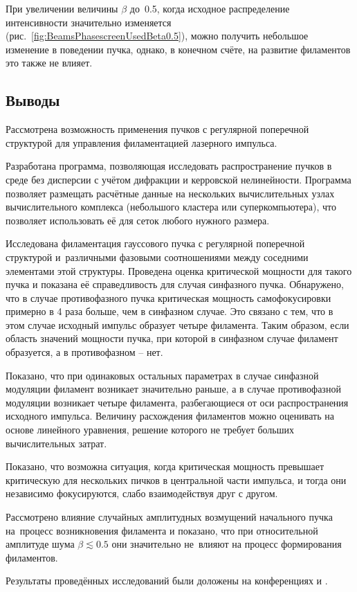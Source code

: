 
При увеличении величины $\beta$ до~0.5, когда исходное распределение интенсивности значительно изменяется (рис.~\ref{fig:BeamsPhasescreenUsedBeta0.5}),
можно получить небольшое изменение в поведении пучка, однако, в конечном счёте, на развитие филаментов это также не влияет.


\subsection{Выводы}

Рассмотрена возможность применения пучков с регулярной поперечной структурой для управления филаментацией
лазерного импульса.


Разработана программа, позволяющая исследовать распространение пучков в среде без дисперсии
с учётом дифракции и керровской нелинейности. Программа позволяет размещать расчётные данные
на нескольких вычислительных узлах вычислительного комплекса (небольшого кластера или суперкомпьютера),
что позволяет использовать её для сеток любого нужного размера.


Исследована филаментация гауссового пучка с регулярной поперечной структурой и~различными фазовыми соотношениями
между соседними элементами этой структуры. Проведена оценка критической мощности для такого пучка и показана её справедливость
для случая синфазного пучка. Обнаружено, что в случае противофазного пучка критическая мощность самофокусировки
примерно в 4 раза больше, чем в синфазном случае. Это связано с тем, что в этом случае исходный импульс образует четыре филамента.
Таким образом, если область значений мощности пучка, при которой в синфазном случае филамент образуется, а в противофазном -- нет.


Показано, что при одинаковых остальных параметрах в случае синфазной модуляции филамент
возникает значительно раньше, а в случае противофазной модуляции возникает четыре филамента,
разбегающиеся от оси распространения исходного импульса. Величину расхождения филаментов
можно оценивать на основе линейного уравнения, решение которого не требует больших вычислительных затрат.


Показано, что возможна ситуация, когда критическая мощность превышает критическую
для нескольких пичков в центральной части импульса, и тогда они независимо фокусируются, слабо взаимодействуя друг с другом.


Рассмотрено влияние случайных амплитудных возмущений начального пучка на~процесс возникновения
филамента и показано, что при относительной амплитуде шума $\beta \lesssim 0.5$ они значительно
не~влияют на процесс формирования филаментов.


Результаты проведённых исследований были доложены на конференциях \cite{Efimov2009} и \cite{ShlenovDergachevEfimov2009}.

